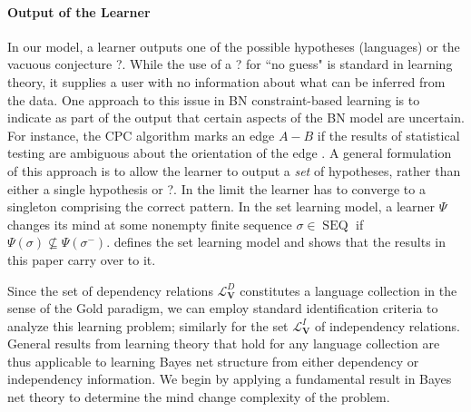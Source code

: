 \documentclass{elsarticle}%
\DeclareMathOperator{\SEQ}{SEQ}
\newcommand{\A}{A}
\newcommand{\B}{B}
\newcommand{\VV}{\mathbf{V}}
\newcommand{\lvd}{\mathcal{L}^{D}_{\VV}}
\newcommand{\lvi}{\mathcal{L}^{I}_{\VV}}
\begin{document}
\paragraph{Output of the Learner} In our model, a learner outputs one of the possible hypotheses (languages) or the vacuous conjecture ?.
While the use of a ? for ``no  guess" is standard in learning theory, it supplies a user with no information about what can be inferred from the data. One approach to this issue in BN constraint-based learning is to indicate as part of the output that certain aspects of the BN model are uncertain. For instance, the CPC algorithm marks an edge $\A - \B$ if the results of statistical testing are ambiguous about the orientation of the edge \cite{Ramsey2006}. 
A general formulation  of this approach is to allow the learner to output a {\em set} of hypotheses, rather than either a single hypothesis or ?. 
In the limit the learner has to converge to a singleton comprising the correct pattern. In the set learning model, a learner $\Psi$ changes its mind at some nonempty finite sequence
$\sigma\in\SEQ$ if $\Psi(\sigma)\not\subseteq \Psi(\sigma^{-})$. 
\cite{Luo07} defines the set learning model and shows that the results in this paper carry over to it.


Since the set of dependency relations $\lvd$ constitutes a language collection in the sense of the Gold paradigm, we can employ standard identification criteria to analyze this learning problem; similarly for the set $\lvi$ of independency relations. General results from learning theory that hold for any language collection are thus applicable to learning Bayes net structure from either dependency or independency information. We begin by applying a fundamental result in Bayes net theory to determine the mind change complexity of the problem.
\end{document}
